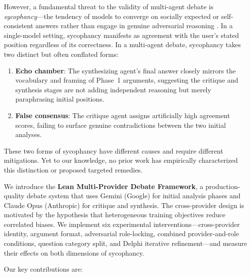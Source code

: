 \documentclass[11pt]{article}
\begin{document}
However, a fundamental threat to the validity of multi-agent debate is \textit{sycophancy}---the tendency of models to converge on socially expected or self-consistent answers rather than engage in genuine adversarial reasoning \citep{perez2022discovering, sharma2023towards}. In a single-model setting, sycophancy manifests as agreement with the user's stated position regardless of its correctness. In a multi-agent debate, sycophancy takes two distinct but often conflated forms:

\begin{enumerate}
    \item \textbf{Echo chamber}: The synthesizing agent's final answer closely mirrors the vocabulary and framing of Phase~1 arguments, suggesting the critique and synthesis stages are not adding independent reasoning but merely paraphrasing initial positions.
    \item \textbf{False consensus}: The critique agent assigns artificially high agreement scores, failing to surface genuine contradictions between the two initial analyses.
\end{enumerate}

These two forms of sycophancy have different causes and require different mitigations. Yet to our knowledge, no prior work has empirically characterized this distinction or proposed targeted remedies.

We introduce the \textbf{Lean Multi-Provider Debate Framework}, a production-quality debate system that uses Gemini (Google) for initial analysis phases and Claude Opus (Anthropic) for critique and synthesis. The cross-provider design is motivated by the hypothesis that heterogeneous training objectives reduce correlated biases. We implement six experimental interventions---cross-provider identity, argument format, adversarial role-locking, combined provider-and-role conditions, question category split, and Delphi iterative refinement---and measure their effects on both dimensions of sycophancy.

Our key contributions are:
\end{document}
